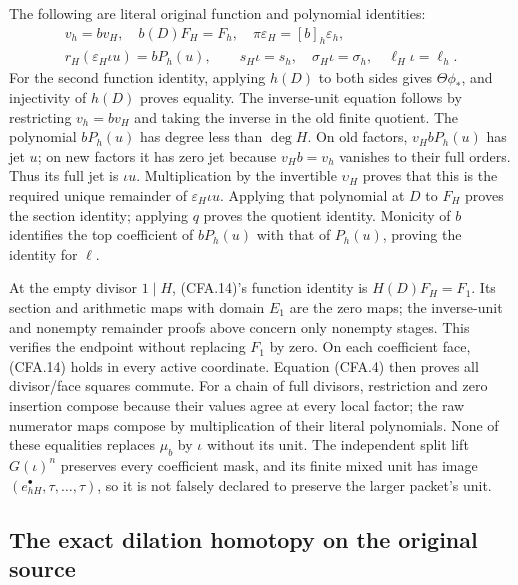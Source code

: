 The following are literal original function and polynomial identities:
\[
\begin{gathered}
 v_h=bv_H,\quad b(D)F_H=F_h,\quad
 \pi\varepsilon_H=[b]_h\varepsilon_h,\\
 r_H(\varepsilon_H\iota u)=bP_h(u),\qquad
 s_H\iota=s_h,\quad\sigma_H\iota=\sigma_h,\quad
 \ell_H\iota=\ell_h.
\end{gathered}                                                 \tag{CFA.14}
\]
For the second function identity, applying $h(D)$ to both sides
gives $\Theta\phi_*$, and injectivity of $h(D)$ proves equality.
The inverse-unit equation follows by restricting
$v_h=bv_H$ and taking the inverse in the old finite quotient.
The polynomial $bP_h(u)$ has degree less than $\deg H$.
On old factors, $v_H bP_h(u)$ has jet $u$; on new factors it has
zero jet because $v_Hb=v_h$ vanishes to their full orders.
Thus its full jet is $\iota u$.  Multiplication by the invertible
$\upsilon_H$ proves that this is the required unique remainder
of $\varepsilon_H\iota u$.  Applying that polynomial at $D$ to
$F_H$ proves the section identity; applying $q$ proves the quotient
identity.  Monicity of $b$ identifies the top coefficient of
$bP_h(u)$ with that of $P_h(u)$, proving the identity for $\ell$.

At the empty divisor $1\mid H$, (CFA.14)'s function identity
is $H(D)F_H=F_1$. Its section and arithmetic maps with domain
$E_1$ are the zero maps; the inverse-unit and nonempty remainder
proofs above concern only nonempty stages. This verifies the
endpoint without replacing $F_1$ by zero.
On each coefficient face, (CFA.14) holds in every active coordinate.
Equation (CFA.4) then proves all divisor/face squares commute.
For a chain of full divisors, restriction and zero insertion compose
because their values agree at every local factor; the raw numerator
maps compose by multiplication of their literal polynomials.  None
of these equalities replaces $\mu_b$ by $\iota$ without its unit.
The independent split lift $G(\iota)^n$ preserves every coefficient
mask, and its finite mixed unit has image
$(e_{hH}^\bullet,\tau,\ldots,\tau)$, so it is not falsely declared
to preserve the larger packet's unit.

\subsection{The exact dilation homotopy on the original source}

